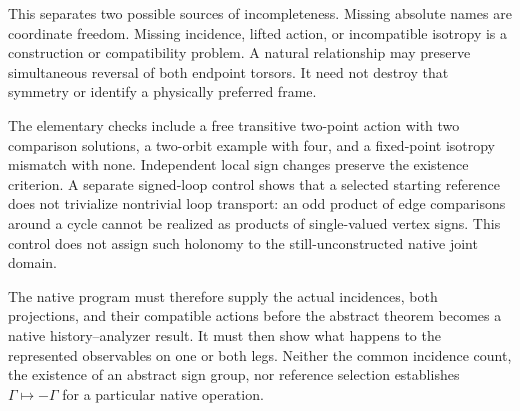 This separates two possible sources of incompleteness. Missing absolute names are coordinate freedom. Missing incidence, lifted action, or incompatible isotropy is a construction or compatibility problem. A natural relationship may preserve simultaneous reversal of both endpoint torsors. It need not destroy that symmetry or identify a physically preferred frame.

The elementary checks include a free transitive two-point action with two comparison solutions, a two-orbit example with four, and a fixed-point isotropy mismatch with none. Independent local sign changes preserve the existence criterion. A separate signed-loop control shows that a selected starting reference does not trivialize nontrivial loop transport: an odd product of edge comparisons around a cycle cannot be realized as products of single-valued vertex signs. This control does not assign such holonomy to the still-unconstructed native joint domain.

The native program must therefore supply the actual incidences, both projections, and their compatible actions before the abstract theorem becomes a native history--analyzer result. It must then show what happens to the represented observables on one or both legs. Neither the common incidence count, the existence of an abstract sign group, nor reference selection establishes $\Gamma\mapsto-\Gamma$ for a particular native operation.

